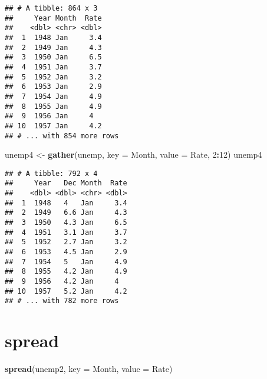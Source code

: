 \documentclass[]{book}
\newenvironment{Shaded}{\begin{snugshade}}{\end{snugshade}}
\newcommand{\DataTypeTok}[1]{\textcolor[rgb]{0.13,0.29,0.53}{#1}}
\newcommand{\DecValTok}[1]{\textcolor[rgb]{0.00,0.00,0.81}{#1}}
\newcommand{\KeywordTok}[1]{\textcolor[rgb]{0.13,0.29,0.53}{\textbf{#1}}}
\newcommand{\NormalTok}[1]{#1}
\newcommand{\OperatorTok}[1]{\textcolor[rgb]{0.81,0.36,0.00}{\textbf{#1}}}
\newcommand{\StringTok}[1]{\textcolor[rgb]{0.31,0.60,0.02}{#1}}
\begin{document}
\begin{verbatim}
## # A tibble: 864 x 3
##     Year Month  Rate
##    <dbl> <chr> <dbl>
##  1  1948 Jan     3.4
##  2  1949 Jan     4.3
##  3  1950 Jan     6.5
##  4  1951 Jan     3.7
##  5  1952 Jan     3.2
##  6  1953 Jan     2.9
##  7  1954 Jan     4.9
##  8  1955 Jan     4.9
##  9  1956 Jan     4  
## 10  1957 Jan     4.2
## # ... with 854 more rows
\end{verbatim}

\begin{Shaded}
\begin{Highlighting}[]
\NormalTok{unemp4 <-}\StringTok{ }\KeywordTok{gather}\NormalTok{(unemp, }\DataTypeTok{key =}\NormalTok{ Month, }\DataTypeTok{value =}\NormalTok{ Rate, }\DecValTok{2}\OperatorTok{:}\DecValTok{12}\NormalTok{)}
\NormalTok{unemp4}
\end{Highlighting}
\end{Shaded}

\begin{verbatim}
## # A tibble: 792 x 4
##     Year   Dec Month  Rate
##    <dbl> <dbl> <chr> <dbl>
##  1  1948   4   Jan     3.4
##  2  1949   6.6 Jan     4.3
##  3  1950   4.3 Jan     6.5
##  4  1951   3.1 Jan     3.7
##  5  1952   2.7 Jan     3.2
##  6  1953   4.5 Jan     2.9
##  7  1954   5   Jan     4.9
##  8  1955   4.2 Jan     4.9
##  9  1956   4.2 Jan     4  
## 10  1957   5.2 Jan     4.2
## # ... with 782 more rows
\end{verbatim}

\hypertarget{spread}{%
\section*{\texorpdfstring{\textbf{spread}}{spread}}\label{spread}}

\begin{Shaded}
\begin{Highlighting}[]
\KeywordTok{spread}\NormalTok{(unemp2, }\DataTypeTok{key =}\NormalTok{ Month, }\DataTypeTok{value =}\NormalTok{ Rate)}
\end{Highlighting}
\end{Shaded}
\end{document}
